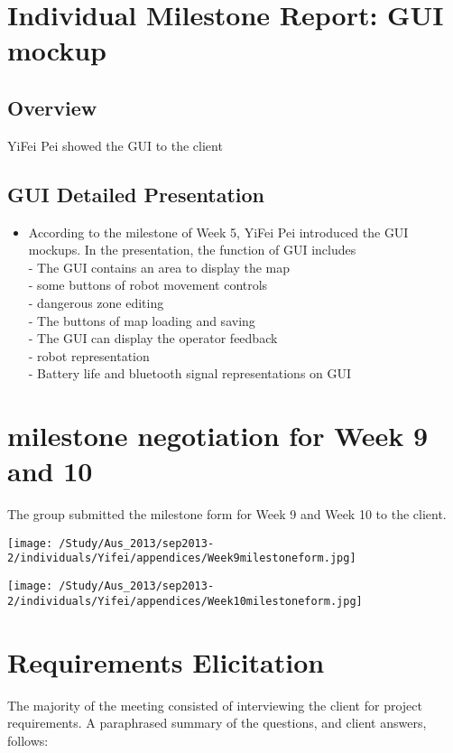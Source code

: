 \documentclass[12pt, a4paper]{article}
\begin{document}
\section{Individual Milestone Report: GUI mockup}
\subsection{Overview}
YiFei Pei showed the GUI to the client
\subsection{GUI Detailed Presentation}
\begin{itemize}
 \item According to the milestone of Week 5, YiFei Pei introduced the GUI mockups. In the presentation, the function of GUI includes 
\\- The GUI contains an area to display the map
\\- some buttons of robot movement controls 
\\- dangerous zone editing
\\- The buttons of map loading and saving
\\- The GUI can display the operator feedback
\\- robot representation
\\- Battery life and bluetooth signal representations on GUI
\end{itemize}
\section{milestone negotiation for Week 9 and 10}

The group submitted the milestone form for Week 9 and Week 10 to the client.

\texttt{[image: /Study/Aus\_2013/sep2013-2/individuals/Yifei/appendices/Week9milestoneform.jpg]}

\texttt{[image: /Study/Aus\_2013/sep2013-2/individuals/Yifei/appendices/Week10milestoneform.jpg]}

\section{Requirements Elicitation}
The majority of the meeting consisted of interviewing the client for project requirements.  A paraphrased summary of the questions, and client answers, follows:
\end{document}
